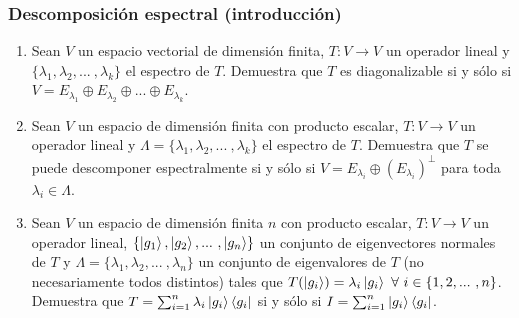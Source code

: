 \documentclass[12pt,libertine]{book}
\begin{document}
\subsubsection*{Descomposición espectral (introducción)} \label{Ejer:Descomposición espectral (introducción)}

\begin{enumerate}
\item Sean $V$ un espacio vectorial de dimensión finita, $T:V\to V$ un operador lineal y $\{\lambda_1,\lambda_2,... \ ,\lambda_k\}$ el espectro de $T$. Demuestra que $T$ es diagonalizable si y sólo si $V=E_{\lambda_1}\oplus E_{\lambda_2}\oplus...\oplus E_{\lambda_k}$.
\item Sean $V$ un espacio de dimensión finita con producto escalar, $T:V\to V$ un operador lineal y $\Lambda=\{\lambda_1,\lambda_2,... \ ,\lambda_k\}$ el espectro de $T$. Demuestra que $T$ se puede descomponer espectralmente si y sólo si $V = E_{\lambda_i} \oplus (E_{\lambda_i})^\perp$ para toda $\lambda_i\in\Lambda$.
\item Sean $V$ un espacio de dimensión finita $n$ con producto escalar, $T:V\to V$ un operador lineal, $\{\ket{g_1}, \ket{g_2}, ... \ ,\ket{g_n}\}$ un conjunto de eigenvectores normales de $T$ y $\Lambda=\{\lambda_1,\lambda_2,... \ ,\lambda_n\}$ un conjunto de eigenvalores de $T$ (no necesariamente todos distintos) tales que $T(\ket{g_i})=\lambda_i \ket{g_i} \ \forall \ i\in\{1,2,... \ ,n\}$. Demuestra que $T=\sum_{i=1}^n \lambda_i \ket{g_i}\bra{g_i}$ si y sólo si $I = \sum_{i=1}^n \ket{g_i}\bra{g_i}$.
\end{enumerate}
\end{document}
